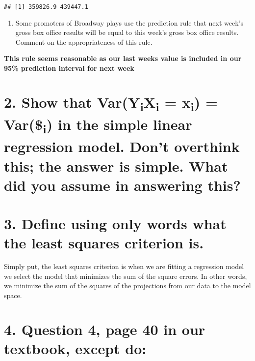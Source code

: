 \documentclass[
]{article}
\providecommand{\tightlist}{%
  \setlength{\itemsep}{0pt}\setlength{\parskip}{0pt}}
\begin{document}
\begin{verbatim}
## [1] 359826.9 439447.1
\end{verbatim}

\begin{enumerate}
\def\labelenumi{(\alph{enumi})}
\setcounter{enumi}{3}
\tightlist
\item
  Some promoters of Broadway plays use the prediction rule that next
  week's gross box office results will be equal to this week's gross box
  office results. Comment on the appropriateness of this rule.
\end{enumerate}

\textbf{This rule seems reasonable as our last weeks value is included
in our 95\% prediction interval for next week}

\hypertarget{show-that-varyixi-xi-vari-in-the-simple-linear-regression-model.-dont-overthink-this-the-answer-is-simple.-what-did-you-assume-in-answering-this}{%
\section{\texorpdfstring{2. Show that
Var(Y\textsubscript{i}\textbar X\textsubscript{i} = x\textsubscript{i})
= Var(\$\epsilon\textsubscript{i}) in the simple linear regression
model. Don't overthink this; the answer is simple. What did you assume
in answering
this?}{2. Show that Var(Yi\textbar Xi = xi) = Var(\$i) in the simple linear regression model. Don't overthink this; the answer is simple. What did you assume in answering this?}}\label{show-that-varyixi-xi-vari-in-the-simple-linear-regression-model.-dont-overthink-this-the-answer-is-simple.-what-did-you-assume-in-answering-this}}

\newpage

\hypertarget{define-using-only-words-what-the-least-squares-criterion-is.}{%
\section{3. Define using only words what the least squares criterion
is.}\label{define-using-only-words-what-the-least-squares-criterion-is.}}

Simply put, the least squares criterion is when we are fitting a
regression model we select the model that minimizes the sum of the
square errors. In other words, we minimize the sum of the squares of the
projections from our data to the model space.

\hypertarget{question-4-page-40-in-our-textbook-except-do}{%
\section{4. Question 4, page 40 in our textbook, except
do:}\label{question-4-page-40-in-our-textbook-except-do}}
\end{document}
